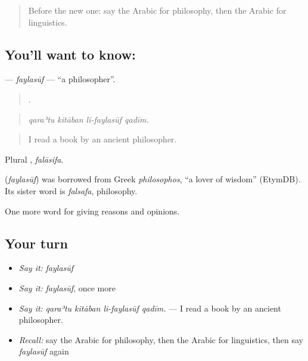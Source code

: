 \label{lesson:AR-C376-faylasuf}



\begin{quote}
Before the new one: say the Arabic for philosophy, then the Arabic for linguistics.
\end{quote}

\subsection*{You'll want to know: }
\textbf{} — \emph{faylasūf} — \textquotedblleft{}a philosopher\textquotedblright{}.

\begin{quote}
   .
\end{quote}

\begin{quote}
\emph{qaraʾtu kitāban li-faylasūf qadīm.}
\end{quote}

\begin{quote}
I read a book by an ancient philosopher.
\end{quote}

Plural , \emph{falāsifa}.

\begin{cousinweb}
\textbf{} (\emph{faylasūf}) was borrowed from Greek \emph{philosophos}, \textquotedblleft{}a lover of wisdom\textquotedblright{} (EtymDB). Its sister word is \emph{falsafa}, philosophy.
\end{cousinweb}

\begin{grammarlens}[title={What you've built}]
One more word for giving reasons and opinions.
\end{grammarlens}

\subsection*{Your turn}
\begin{itemize}
\raggedright
  \item \emph{Say it:} \emph{faylasūf}
  \item \emph{Say it:} \emph{faylasūf}, once more
  \item \emph{Say it:} \emph{qaraʾtu kitāban li-faylasūf qadīm.} — I read a book by an ancient philosopher.
  \item \emph{Recall:} say the Arabic for philosophy, then the Arabic for linguistics, then say \emph{faylasūf} again
\end{itemize}

